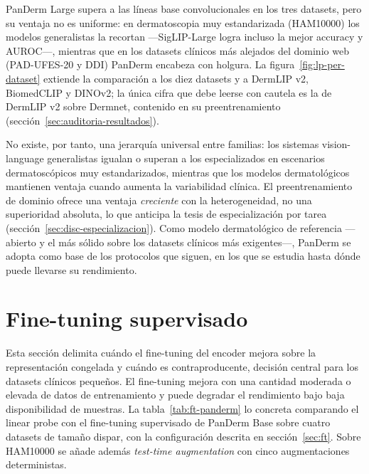 PanDerm Large supera a las líneas base convolucionales en los tres
datasets, pero su ventaja no es uniforme: en dermatoscopia muy
estandarizada (HAM10000) los modelos generalistas la recortan
---SigLIP-Large logra incluso la mejor accuracy y AUROC---, mientras
que en los datasets clínicos más alejados del dominio web (PAD-UFES-20
y DDI) PanDerm encabeza con holgura. La figura~\ref{fig:lp-per-dataset}
extiende la comparación a los diez datasets y a DermLIP v2, BiomedCLIP
y DINOv2; la única cifra que debe leerse con cautela es la de DermLIP
v2 sobre Dermnet, contenido en su preentrenamiento
(sección~\ref{sec:auditoria-resultados}).

No existe, por tanto, una jerarquía universal entre familias: los
sistemas vision-language generalistas igualan o superan a los
especializados en escenarios dermatoscópicos muy estandarizados,
mientras que los modelos dermatológicos mantienen ventaja cuando aumenta
la variabilidad clínica. El preentrenamiento de dominio ofrece una
ventaja \emph{creciente} con la heterogeneidad, no una superioridad
absoluta, lo que anticipa la tesis de especialización por tarea
(sección~\ref{sec:disc-especializacion}). Como modelo dermatológico de
referencia ---abierto y el más sólido sobre los datasets clínicos más
exigentes---, PanDerm se adopta como base de los protocolos que siguen,
en los que se estudia hasta dónde puede llevarse su rendimiento.

\section{Fine-tuning supervisado}
\label{sec:ft-results}

Esta sección delimita cuándo el fine-tuning del encoder mejora sobre
la representación congelada y cuándo es contraproducente, decisión
central para los datasets clínicos pequeños. El fine-tuning mejora con
una cantidad moderada o elevada de datos de entrenamiento y puede
degradar el rendimiento bajo baja disponibilidad de muestras. La
tabla~\ref{tab:ft-panderm} lo concreta comparando el
linear probe con el fine-tuning supervisado de PanDerm Base sobre
cuatro datasets de tamaño dispar, con la configuración descrita
en sección~\ref{sec:ft}. Sobre HAM10000 se añade además
\emph{test-time augmentation} con cinco augmentaciones
deterministas.

